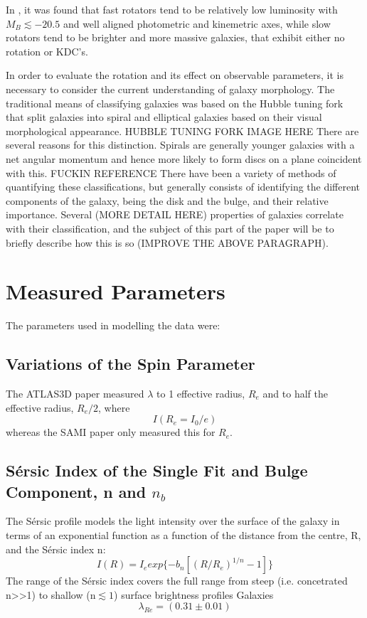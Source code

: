 In \cite{Emsellem2008}, it was found that fast rotators tend to be relatively low luminosity with $M_{B}\lesssim-20.5$ and well aligned photometric and kinemetric axes, while slow rotators tend to be brighter and more massive galaxies, that exhibit either no rotation or KDC's.



In order to evaluate the rotation and its effect on observable parameters, it is necessary to consider the current understanding of galaxy morphology. The traditional means of classifying galaxies was based on the Hubble tuning fork that split galaxies into spiral and elliptical galaxies based on their visual morphological appearance.
HUBBLE TUNING FORK IMAGE HERE
There are several reasons for this distinction. Spirals are generally younger galaxies with a net angular momentum and hence more likely to form discs on a plane coincident with this. FUCKIN REFERENCE
There have been a variety of methods of quantifying these classifications, but generally consists of identifying the different components of the galaxy, being the disk and the bulge, and their relative importance.  Several (MORE DETAIL HERE) properties of galaxies correlate with their classification, and the subject of this part of the paper will be to briefly describe how this is so (IMPROVE THE ABOVE PARAGRAPH).
\section{Measured Parameters}
The parameters used in modelling the data were:
\subsection{Variations of the Spin Parameter}
The ATLAS3D paper measured $\lambda$ to 1 effective radius, $R_{e}$ and to half the effective radius, $R_{e}/2$, where 
\begin{equation}
I(R_{e}=I_{0}/e)
\end{equation}
whereas the SAMI paper only measured this for $R_{e}$\cite[p.~3]{Cortese2016}. 
\subsection{S\'ersic Index of the Single Fit and Bulge Component, n and $n_{b}$}
The S\'ersic profile models the light intensity over the surface of the galaxy in terms of an exponential function as a function of the distance from the centre, R, and the S\'ersic index n:
\begin{equation}
I(R) = I_{e} exp\{-b_{n} [(R/R_{e})^{1/n}-1]\}
\end{equation}
The range of the S\'ersic index covers the full range from steep (i.e. concetrated n>>1) to shallow (n$\lesssim 1$) surface brightness profiles %
Galaxies 
\begin{equation}
\lambda_{Re}=(0.31\pm0.01)
\end{equation}
